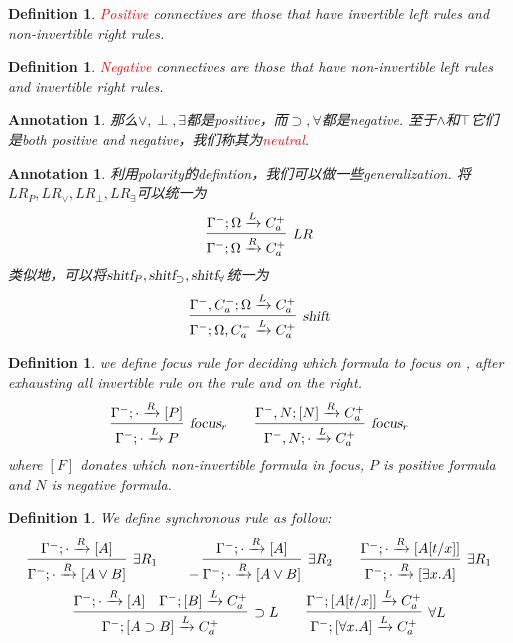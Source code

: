 \documentclass{article}
\theoremstyle{plain}
\newtheorem{definition}[theorem]{Definition}
\newtheorem{annotation}[theorem]{Annotation}
\theoremstyle{nonumberplain}
\newcommand{\redt}[1]{\textcolor{red}{#1}}
\begin{document}
\begin{definition}
\rm \redt{Positive} connectives are those that have invertible left rules and non-invertible right rules. 
\end{definition}

\begin{definition}
\rm \redt{Negative} connectives are those that have non-invertible left rules and invertible right rules.
\end{definition}

\begin{annotation}
\rm 那么$\vee, \perp, \exists$都是positive，而$\supset, \forall$都是negative. 至于$\wedge$和$\top$它们是both positive and negative，我们称其为\redt{neutral}.
\end{annotation}


\begin{annotation}
\rm 利用polarity的defintion，我们可以做一些generalization. 将$LR_P, LR_\vee, LR_\perp, LR_\exists$可以统一为
\[
\infer[LR]{\Gamma^-;\Omega \xrightarrow{R} C_a^+}{\Gamma^-;\Omega \xrightarrow{L} C_a^+}
\]
类似地，可以将$\textsl{shitf}_P, \textsl{shitf}_\supset, \textsl{shitf}_\forall$统一为
$$
\infer[\textsl{shift}]{\Gamma^-;\Omega, C_a^- \xrightarrow{L} C_a^+}{\Gamma^-,C_a^-;\Omega \xrightarrow{L} C_a^+}
$$
\end{annotation}

\begin{definition}
\rm we define \textsl{focus} rule for deciding which formula to focus on , after exhausting all invertible rule on the rule and on the right. 
\[
\infer[\textsl{focus}_r]{\Gamma^-;\cdot \xrightarrow{L} P}{\Gamma^-;\cdot \xrightarrow{R} [P]} \quad \quad  \infer[\textsl{focus}_r]{\Gamma^-, N;\cdot \xrightarrow{L} C_a^+}{\Gamma^-, N; [N] \xrightarrow{R} C_a^+}
\]
where $[F]$ donates which non-invertible formula in focus, $P$ is positive formula and $N$ is negative formula. 
\end{definition}

\begin{definition}\label{synchronous-rule-in-focus-calculus}
\rm We define \emph{synchronous} rule as follow:
\[
\begin{gathered}
\infer[\exists R_1]{\Gamma^-;\cdot \xrightarrow{R} [A \vee B]}{\Gamma^-;\cdot \xrightarrow{R}[A]} \quad\quad
-\infer[\exists R_2]{\Gamma^-;\cdot \xrightarrow{R} [A \vee B]}{\Gamma^-;\cdot \xrightarrow{R} [A]} \quad\quad
\infer[\exists R_1]{\Gamma^-;\cdot \xrightarrow{R} [\exists x.A]}{\Gamma^-;\cdot \xrightarrow{R} [A[t/x]]} \\
\infer[\supset L]{\Gamma^-;[A\supset B] \xrightarrow{L} C_a^+}{\Gamma^-;\cdot \xrightarrow{R} [A] & \Gamma^-;[B] \xrightarrow{L} C_a^+} \quad\quad
\infer[\forall L]{\Gamma^-;[\forall x.A] \xrightarrow{L} C_a^+ }{\Gamma^-;[A[t/x]] \xrightarrow{L} C_a^+ }
\end{gathered}
\]
\end{definition}
\end{document}
